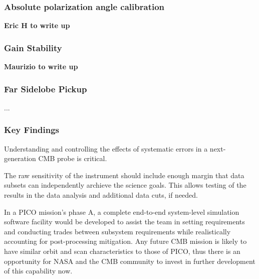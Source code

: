 \documentclass[PICOReport.tex]{subfiles}
\begin{document}
\subsubsection{Absolute polarization angle calibration}
\label{sec:angle}
\textbf{Eric H to write up}

\subsubsection{Gain Stability}
\label{sec:gain}
\textbf{Maurizio to write up}

\subsubsection{Far Sidelobe Pickup}
\label{sec:fsl}
...

\subsubsection{Key Findings}
Understanding and controlling the effects of systematic errors in a
next-generation CMB probe is critical.

The raw sensitivity of the instrument should include enough margin
that data subsets can independently archieve the science goals.
This allows testing of the results in the data analysis and additional
data cuts, if needed.

In a PICO mission's phase A, a complete end-to-end system-level
simulation software facility would be developed to assist the team in setting 
requirements and conducting trades between subsystem requirements while
realistically accounting for post-processing mitigation.  Any future
CMB mission is likely to have similar orbit  
and scan characteristics to those of PICO, thus there is an opportunity for NASA and
the CMB community to invest in further development of this capability now.
\end{document}
